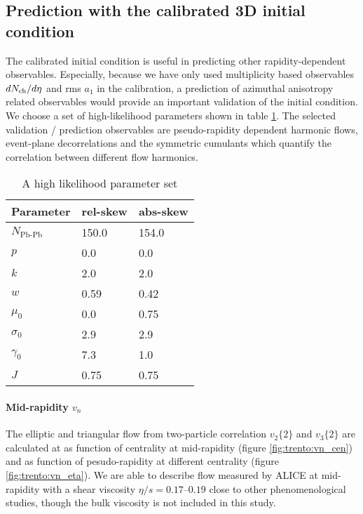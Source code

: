 \subsection{Prediction with the calibrated 3D initial condition}
The calibrated initial condition is useful in predicting other rapidity-dependent observables.
Especially, because we have only used multiplicity based observables $dN_\text{ch}/d\eta$ and rms $a_1$ in the calibration, a prediction of azimuthal anisotropy related observables would provide an important validation of the initial condition.
We choose a set of high-likelihood parameters shown in table \ref{tab:chosen_parameters}.
The selected validation / prediction observables are pseudo-rapidity dependent harmonic flows, event-plane decorrelations and the symmetric cumulants which quantify the correlation between different flow harmonics.

\begin{table}
\centering
\caption{A high likelihood parameter set}
\begin{tabular}{lll}
\hline
Parameter & rel-skew	& abs-skew \\
\hline
$N_{\textrm{Pb-Pb}}$   & 150.0     & 154.0  \\
$p$	    & 0.0      & 0.0  \\
$k$	    & 2.0     & 2.0  \\
$w$	    & 0.59     & 0.42  \\
$\mu_0$   & 0.0     & 0.75  \\
$\sigma_0$ & 2.9    & 2.9  \\
$\gamma_0$ & 7.3		& 1.0	\\
$J$	     & 0.75 & 0.75	\\
\hline
\end{tabular}
\label{tab:chosen_parameters}    
\end{table}

\paragraph{Mid-rapidity $v_n$} The elliptic and triangular flow from two-particle correlation $v_2\{2\}$ and $v_3\{2\}$ are calculated at as function of centrality at mid-rapidity (figure \ref{fig:trento:vn_cen}) and as function of pesudo-rapidity at different centrality (figure \ref{fig:trento:vn_eta}).
We are able to describe flow measured by ALICE \cite{Adam:2016izf} at mid-rapidity with a shear viscosity $\eta/s = 0.17$--$0.19$ close to other phenomenological studies, though the bulk viscosity is not included in this study.

